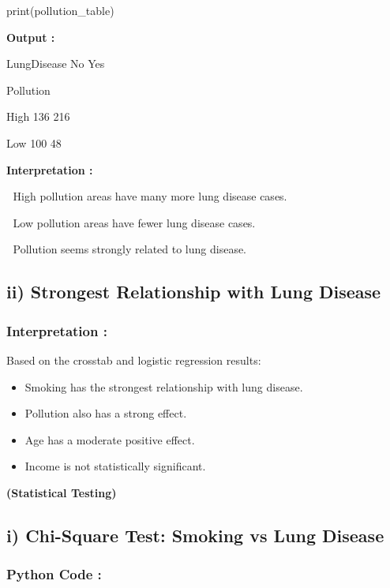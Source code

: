 \documentclass[
]{article}
\begin{document}
print(pollution\_table)

\textbf{Output :}

LungDisease No Yes

Pollution

High 136 216

Low 100 48

\textbf{Interpretation :}

 High pollution areas have many more lung disease cases.

 Low pollution areas have fewer lung disease cases.

 Pollution seems strongly related to lung disease.

\subsection{\texorpdfstring{\textbf{ii) Strongest Relationship with Lung
Disease}}{ii) Strongest Relationship with Lung Disease}}\label{ii-strongest-relationship-with-lung-disease}

\subsubsection{Interpretation :}\label{interpretation}

Based on the crosstab and logistic regression results:

\begin{itemize}
\item
  Smoking has the strongest relationship with lung disease.
\item
  Pollution also has a strong effect.
\item
  Age has a moderate positive effect.
\item
  Income is not statistically significant.
\end{itemize}

\textbf{(Statistical Testing)}

\subsection{\texorpdfstring{\textbf{i) Chi-Square Test: Smoking vs Lung
Disease}}{i) Chi-Square Test: Smoking vs Lung Disease}}\label{i-chi-square-test-smoking-vs-lung-disease}

\subsubsection{Python Code :}\label{python-code}
\end{document}
